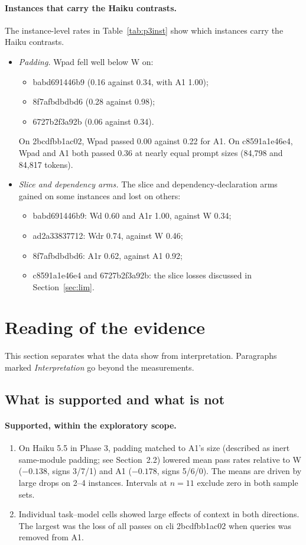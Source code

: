 \paragraph{Instances that carry the Haiku contrasts.} The instance-level rates in Table~\ref{tab:p3inst} show which instances carry the Haiku contrasts.
\begin{itemize}
\item \emph{Padding.} Wpad fell well below W on:
  \begin{itemize}
  \item babd691446b9 (0.16 against 0.34, with A1 1.00);
  \item 8f7afbdbdbd6 (0.28 against 0.98);
  \item 6727b2f3a92b (0.06 against 0.34).
  \end{itemize}
  On 2bcdfbb1ac02, Wpad passed 0.00 against 0.22 for A1. On c8591a1e46e4, Wpad and A1 both passed 0.36 at nearly equal prompt sizes (84,798 and 84,817 tokens).
\item \emph{Slice and dependency arms.} The slice and dependency-declaration arms gained on some instances and lost on others:
  \begin{itemize}
  \item babd691446b9: Wd 0.60 and A1r 1.00, against W 0.34;
  \item ad2a33837712: Wdr 0.74, against W 0.46;
  \item 8f7afbdbdbd6: A1r 0.62, against A1 0.92;
  \item c8591a1e46e4 and 6727b2f3a92b: the slice losses discussed in Section~\ref{sec:lim}.
  \end{itemize}
\end{itemize}

\section{Reading of the evidence}

This section separates what the data show from interpretation. Paragraphs marked \emph{Interpretation} go beyond the measurements.

\subsection{What is supported and what is not}

\paragraph{Supported, within the exploratory scope.}
\begin{enumerate}
\item On Haiku 5.5 in Phase 3, padding matched to A1's size (described as inert same-module padding; see Section~2.2) lowered mean pass rates relative to W ($-0.138$, signs 3/7/1) and A1 ($-0.178$, signs 5/6/0). The means are driven by large drops on 2--4 instances. Intervals at $n=11$ exclude zero in both sample sets.
\item Individual task--model cells showed large effects of context in both directions. The largest was the loss of all passes on cli 2bcdfbb1ac02 when queries was removed from A1.
\end{enumerate}

